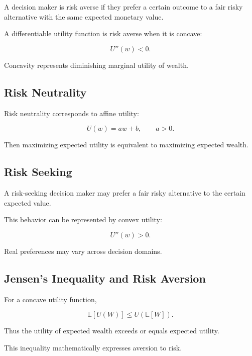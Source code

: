 A decision maker is risk averse if they prefer a certain outcome to a fair
risky alternative with the same expected monetary value.

A differentiable utility function is risk averse when it is concave:

\[
\boxed{
U''(w)<0.
}
\]

Concavity represents diminishing marginal utility of wealth.

\subsection{Risk Neutrality}
\label{subsec:risk-neutrality}

Risk neutrality corresponds to affine utility:

\[
\boxed{
U(w)
=
aw+b,
\qquad
a>0.
}
\]

Then maximizing expected utility is equivalent to maximizing expected
wealth.

\subsection{Risk Seeking}
\label{subsec:risk-seeking}

A risk-seeking decision maker may prefer a fair risky alternative to the
certain expected value.

This behavior can be represented by convex utility:

\[
\boxed{
U''(w)>0.
}
\]

Real preferences may vary across decision domains.

\subsection{Jensen's Inequality and Risk Aversion}
\label{subsec:jensen-risk-aversion}

For a concave utility function,

\[
\boxed{
\mathbb{E}
[
U(W)
]
\leq
U
(
\mathbb{E}[W]
).
}
\]

Thus the utility of expected wealth exceeds or equals expected utility.

This inequality mathematically expresses aversion to risk.

